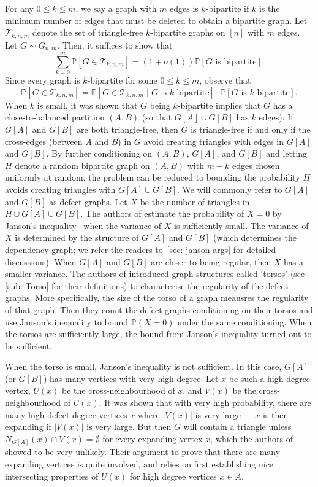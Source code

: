 \documentclass[11pt]{article}
\def\P{\mathbb P}
\theoremstyle{plain}
\begin{document}
For any $0 \leq k \leq m$, we say a graph with $m$ edges is $k$-bipartite if $k$ is the minimum number of edges that must be deleted to obtain a bipartite graph. Let $\mathcal T_{k,n,m}$ denote the set of triangle-free $k$-bipartite graphs on $[n]$ with $m$ edges. Let $G \sim G_{n,m}$. Then, it suffices to show that
\[
\sum_{k = 0}^{m}\P[G \in \mathcal T_{k,n,m}] = (1 + o(1))\P[G \text{ is bipartite}].
\]
Since every graph is $k$-bipartite for some $0 \leq k \leq m$, observe that 
\[
\P[G \in \mathcal T_{k, n,m}] = \P[G \in \mathcal T_{k,n,m} \mathrel | G \text{ is $k$-bipartite}]\cdot\P[G \text{ is $k$-bipartite}].
\]
When $k$ is small, it was shown that $G$ being $k$-bipartite implies that $G$ has a close-to-balanced partition $(A,B)$ (so that $G[A]\cup G[B]$ has $k$ edges). If $G[A]$ and $G[B]$ are both triangle-free, then $G$ is triangle-free if and only if the cross-edges (between $A$ and $B$) in $G$ avoid creating triangles with edges in $G[A]$ and $G[B]$. By further conditioning on $(A,B)$, $G[A]$, and $G[B]$ and letting $H$ denote a random bipartite graph on $(A,B)$ with $m-k$ edges chosen uniformly at random, the problem can be reduced to bounding the probability $H$ avoids creating triangles with $G[A]\cup G[B]$. We will commonly refer to $G[A]$ and $G[B]$ as defect graphs. Let $X$ be the number of triangles in $H\cup G[A]\cup G[B]$. 
The authors of \cite{osthus2003densities} estimate the probability of $X=0$ by Janson's inequality~\cite{janson1988exponential} when the variance of $X$ is sufficiently small.
The variance of $X$ is determined by the structure of $G[A]$ and $G[B]$ (which determines the dependency graph; we refer the readers to~\cref{sec: janson args} for detailed discussions). When $G[A]$ and $G[B]$ are closer to being regular, then $X$ has a smaller variance. The authors of \cite{osthus2003densities} introduced graph structures called `torsos' (see \cref{sub: Torso} for their definitions) to characterise the regularity of the defect graphs. More specifically, the size of the torso of a graph meausres the regularity of that graph. Then they count the defect graphs conditioning on their torsos and use Janson's inequality to bound $\P(X=0)$ under the same conditioning. When the torsos are sufficiently large, the bound from  Janson's inequality turned out to be sufficient.


When the torso is small, Janson's inequality is not sufficient. In this case, $G[A]$ (or $G[B]$) has many vertices with very high degree. Let $x$ be such a high degree vertex, $U(x)$ be the cross-neighbourhood of $x$, and $V(x)$ be the cross-neighbourhood of $U(x)$. It was shown that with very high probability, there are many high defect degree vertices $x$ where $|V(x)|$ is very large --- $x$ is then expanding if $|V(x)|$ is very large. But then $G$ will contain a triangle unless $N_{G[A]}(x) \cap V(x) = \emptyset$ for every expanding vertex $x$, which the authors of \cite{osthus2003densities} showed to be very unlikely. Their argument to prove that there are many expanding vertices is quite involved, and relies on first establishing nice intersecting properties of $U(x)$ for high degree vertices $x\in A$.
\end{document}
